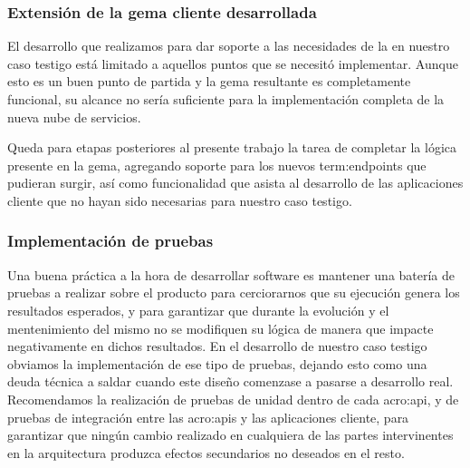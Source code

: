 \subsubsection{Extensión de la gema cliente desarrollada}

El desarrollo que realizamos para dar soporte a las necesidades de la {\cloud} en nuestro caso testigo está limitado a aquellos puntos que se necesitó implementar. Aunque esto es un buen punto de partida y la gema resultante es completamente funcional, su alcance no sería suficiente para la implementación completa de la nueva nube de servicios.

Queda para etapas posteriores al presente trabajo la tarea de completar la lógica presente en la gema, agregando soporte para los nuevos \glspl{term:endpoint} que pudieran surgir, así como funcionalidad que asista al desarrollo de las aplicaciones cliente que no hayan sido necesarias para nuestro caso testigo.

\subsubsection{Implementación de pruebas}

Una buena práctica a la hora de desarrollar software es mantener una batería de pruebas a realizar sobre el producto para cerciorarnos que su ejecución genera los resultados esperados, y para garantizar que durante la evolución y el mentenimiento del mismo no se modifiquen su lógica de manera que impacte negativamente en dichos resultados. En el desarrollo de nuestro caso testigo obviamos la implementación de ese tipo de pruebas, dejando esto como una deuda técnica a saldar cuando este diseño comenzase a pasarse a desarrollo real. Recomendamos la realización de pruebas de unidad dentro de cada \gls{acro:api}, y de pruebas de integración entre las \glspl{acro:api} y las aplicaciones cliente, para garantizar que ningún cambio realizado en cualquiera de las partes intervinentes en la arquitectura produzca efectos secundarios no deseados en el resto.
